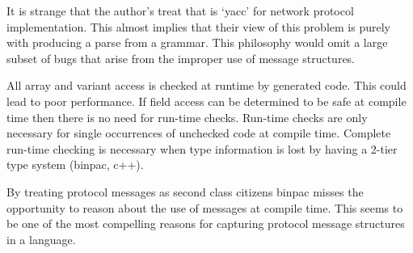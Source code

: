 It is strange that the author's treat that is `yacc' for network protocol
implementation. This almost implies that their view of this problem is purely
with producing a parse from a grammar. This philosophy would omit a large
subset of bugs that arise from the improper use of message structures.

All array and variant access is checked at runtime by generated code. This could
lead to poor performance. If field access can be determined to be safe at
compile time then there is no need for run-time checks. Run-time checks are only
necessary for single occurrences of unchecked code at compile time. Complete 
run-time checking is necessary when type information is lost by having a 2-tier
type system (binpac, c++).

By treating protocol messages as second class citizens binpac misses the
opportunity to reason about the use of messages at compile time. This seems to
be one of the most compelling reasons for capturing protocol message structures
in a language.
